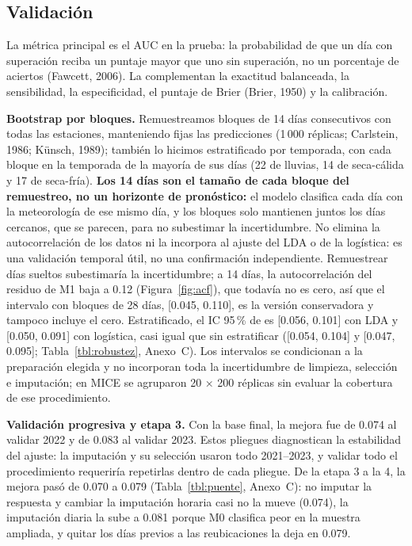 \subsection{Validación}\label{sec:validacion}
La métrica principal es el AUC en la prueba: la probabilidad de que un día con superación reciba un puntaje mayor que uno sin superación, no un porcentaje de aciertos (Fawcett, 2006). La complementan la exactitud balanceada, la sensibilidad, la especificidad, el puntaje de Brier (Brier, 1950) y la calibración.

\textbf{Bootstrap por bloques.} Remuestreamos bloques de 14 días consecutivos con todas las estaciones, manteniendo fijas las predicciones (1\,000 réplicas; Carlstein, 1986; Künsch, 1989); también lo hicimos estratificado por temporada, con cada bloque en la temporada de la mayoría de sus días (22 de lluvias, 14 de seca-cálida y 17 de seca-fría). \textbf{Los 14 días son el tamaño de cada bloque del remuestreo, no un horizonte de pronóstico:} el modelo clasifica cada día con la meteorología de ese mismo día, y los bloques solo mantienen juntos los días cercanos, que se parecen, para no subestimar la incertidumbre. No elimina la autocorrelación de los datos ni la incorpora al ajuste del LDA o de la logística: es una validación temporal útil, no una confirmación independiente. Remuestrear días sueltos subestimaría la incertidumbre; a 14 días, la autocorrelación del residuo de M1 baja a 0.12 (Figura~\ref{fig:acf}), que todavía no es cero, así que el intervalo con bloques de 28 días, [0.045, 0.110], es la versión conservadora y tampoco incluye el cero. Estratificado, el IC 95\,\% de \dauc{} es [0.056, 0.101] con LDA y [0.050, 0.091] con logística, casi igual que sin estratificar ([0.054, 0.104] y [0.047, 0.095]; Tabla~\ref{tbl:robustez}, Anexo~C). Los intervalos se condicionan a la preparación elegida y no incorporan toda la incertidumbre de limpieza, selección e imputación; en MICE se agruparon 20 × 200 réplicas sin evaluar la cobertura de ese procedimiento.

\textbf{Validación progresiva y etapa 3.} Con la base final, la mejora fue de 0.074 al validar 2022 y de 0.083 al validar 2023. Estos pliegues diagnostican la estabilidad del ajuste: la imputación y su selección usaron todo 2021–2023, y validar todo el procedimiento requeriría repetirlas dentro de cada pliegue. De la etapa 3 a la 4, la mejora pasó de 0.070 a 0.079 (Tabla~\ref{tbl:puente}, Anexo~C): no imputar la respuesta y cambiar la imputación horaria casi no la mueve (0.074), la imputación diaria la sube a 0.081 porque M0 clasifica peor en la muestra ampliada, y quitar los días previos a las reubicaciones la deja en 0.079.


